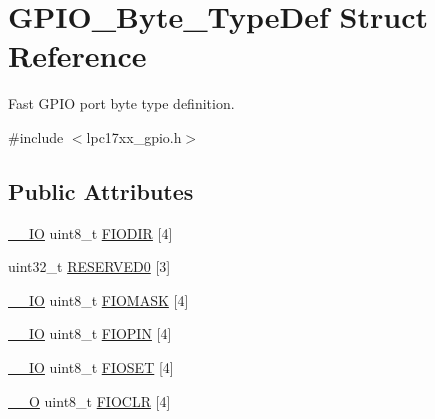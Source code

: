 \hypertarget{struct_g_p_i_o___byte___type_def}{\section{\-G\-P\-I\-O\-\_\-\-Byte\-\_\-\-Type\-Def \-Struct \-Reference}
\label{struct_g_p_i_o___byte___type_def}
}


\-Fast \-G\-P\-I\-O port byte type definition.  




{\ttfamily \#include $<$lpc17xx\-\_\-gpio.\-h$>$}

\subsection*{\-Public \-Attributes}
\begin{DoxyCompactItemize}
\item 
\hyperlink{group___c_m_s_i_s__core__definitions_gaec43007d9998a0a0e01faede4133d6be}{\-\_\-\-\_\-\-I\-O} uint8\-\_\-t \hyperlink{struct_g_p_i_o___byte___type_def_ada52a3477303674fa35bda0de6293425}{\-F\-I\-O\-D\-I\-R} \mbox{[}4\mbox{]}
\item 
uint32\-\_\-t \hyperlink{struct_g_p_i_o___byte___type_def_aaa66661eb3d06d2b93d55a580d8f43c9}{\-R\-E\-S\-E\-R\-V\-E\-D0} \mbox{[}3\mbox{]}
\item 
\hyperlink{group___c_m_s_i_s__core__definitions_gaec43007d9998a0a0e01faede4133d6be}{\-\_\-\-\_\-\-I\-O} uint8\-\_\-t \hyperlink{struct_g_p_i_o___byte___type_def_a3351a95084187896825855ac5b06d452}{\-F\-I\-O\-M\-A\-S\-K} \mbox{[}4\mbox{]}
\item 
\hyperlink{group___c_m_s_i_s__core__definitions_gaec43007d9998a0a0e01faede4133d6be}{\-\_\-\-\_\-\-I\-O} uint8\-\_\-t \hyperlink{struct_g_p_i_o___byte___type_def_abed435a35047947234bb484581f694a2}{\-F\-I\-O\-P\-I\-N} \mbox{[}4\mbox{]}
\item 
\hyperlink{group___c_m_s_i_s__core__definitions_gaec43007d9998a0a0e01faede4133d6be}{\-\_\-\-\_\-\-I\-O} uint8\-\_\-t \hyperlink{struct_g_p_i_o___byte___type_def_aec9356e948f1a087f9ddb2353f4ccfcc}{\-F\-I\-O\-S\-E\-T} \mbox{[}4\mbox{]}
\item 
\hyperlink{group___c_m_s_i_s__core__definitions_ga7e25d9380f9ef903923964322e71f2f6}{\-\_\-\-\_\-\-O} uint8\-\_\-t \hyperlink{struct_g_p_i_o___byte___type_def_a8b767b63e0519fca0e714338443e8780}{\-F\-I\-O\-C\-L\-R} \mbox{[}4\mbox{]}
\end{DoxyCompactItemize}


